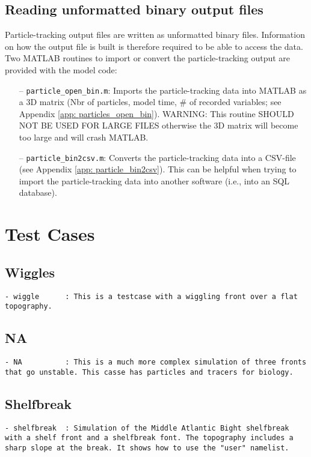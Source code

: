 \documentclass[12pt,letterpaper,titlepage]{article}
\begin{document}
\subsection{Reading unformatted binary output files}
Particle-tracking output files are written as unformatted binary files. Information on how the output file is built is therefore required to be able to access the data. Two MATLAB routines to import or convert the particle-tracking output are provided with the model code:
\begin{enumerate}
	\item [--] \texttt{particle\_open\_bin.m}: Imports the particle-tracking data into MATLAB as a 3D matrix (Nbr of particles, model time, \# of recorded variables; see Appendix \ref{app: particles_open_bin}). WARNING: This routine SHOULD NOT BE USED FOR LARGE FILES otherwise the 3D matrix will become too large and will crash MATLAB.
	\item [--] \texttt{particle\_bin2csv.m}: Converts the particle-tracking data into a CSV-file (see Appendix \ref{app: particle_bin2csv}). This can be helpful when trying to import the particle-tracking data into another software (i.e., into an SQL database).
	\end{enumerate}

\section{Test Cases}
\subsection{Wiggles}
\label{sec: Wiggles}
\begin{lstlisting}
- wiggle      : This is a testcase with a wiggling front over a flat topography.  
\end{lstlisting}

\subsection{NA}
\label{sec: NA}
\begin{lstlisting}
- NA          : This is a much more complex simulation of three fronts that go unstable. This casse has particles and tracers for biology.
\end{lstlisting}

\subsection{Shelfbreak}
\label{sec: Shelfbreak}
\begin{lstlisting}
- shelfbreak  : Simulation of the Middle Atlantic Bight shelfbreak with a shelf front and a shelfbreak font. The topography includes a sharp slope at the break. It shows how to use the "user" namelist. 
\end{lstlisting}
\end{document}
